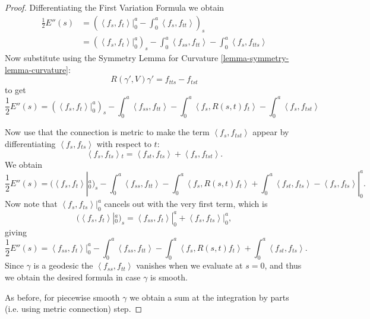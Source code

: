 \begin{proof}
Differentiating the First Variation
Formula we obtain
$$
\begin{aligned}
\frac{1}{2}E''(s)&
=\left(
\left\langle{}f_s,f_t\right\rangle{}|_{0}^a
-\int_0^a\left\langle{}f_s,f_{tt}\right\rangle{}\right)_s\\
&=(\left\langle{}f_s,f_t\right\rangle{}|_{0}^a)_s
-\int_0^a\left\langle{}f_{ss},f_{tt}\right\rangle{}
-\int_0^a\left\langle{}f_s,f_{tts}\right\rangle{}
\end{aligned}
$$
Now substitute
using the Symmetry Lemma for Curvature
\ref{lemma-symmetry-lemma-curvature}:
$$
R(\gamma',V)\gamma'
=f_{t
ts}-f_{tst}
$$
to get
$$
\frac{1}{2}E''(s)=
(\left\langle{}f_s,f_t\right\rangle{}|_{0}^a)_s
-\int_0^a \left\langle{}f_{ss},f_{tt}\right\rangle{}
-\int_0^a\left\langle{}f_s,R(s,t)f_t\right\rangle{}
-\int_0^a\left\langle{}f_s,f_{t s t}\right\rangle{}
$$

Now use that the connection is metric
to make the term $\left\langle{}f_s,f_{tst}\right\rangle{}$ 
appear by differentiating 
$\left\langle{}f_s,f_{t s}\right\rangle{}$
with respect to $t$:
$$
\left\langle{}f_s,f_{ts}\right\rangle{}_t
=\left\langle{}f_{st},f_{ts}\right\rangle{}
+ \left\langle{}f_s,f_{t s t}\right\rangle{}.
$$
We obtain
$$
\frac{1}{2}E''(s)=
(\left\langle{}f_s,f_t\right\rangle{}|_{0}^a)_s
-\int_0^a \left\langle{}f_{ss},f_{tt}\right\rangle{}
-\int_0^a\left\langle{}f_s,R(s,t)f_t\right\rangle{}
+\int_0^a\left\langle{}f_{s t},f_{t s}\right\rangle{}
-\left\langle{}f_s,f_{t s}\right\rangle{}|_0^a.
$$
Now note that $\left\langle{}f_s,f_{t s}\right\rangle{}|_0^a$
cancels out with the very first term,
which is
$$
(\left\langle{}f_s,f_t\right\rangle{}|_0^a)_s
=\left\langle{}f_{s s},f_t\right\rangle{}|_0^a
+\left\langle{}f_s,f_{t s}\right\rangle{}|_0^a,
$$
giving
$$
\frac{1}{2}E''(s)=
\left\langle{}f_{ss},f_t\right\rangle{}|_{0}^a
-\int_0^a \left\langle{}f_{ss},f_{tt}\right\rangle{}
-\int_0^a\left\langle{}f_s,R(s,t)f_t\right\rangle{}
+\int_0^a\left\langle{}f_{s t},f_{t s}\right\rangle{}.
$$
Since $\gamma$ is a geodesic the
$\left\langle{}f_{ss},f_{tt}\right\rangle{}$ vanishes
when we evaluate at $s=0$,
and thus we obtain the desired formula
in case $\gamma$
is smooth.

As before, for piecewise smooth $\gamma$
we obtain a sum at the integration
by parts (i.e. using metric connection)
step.
\end{proof}

